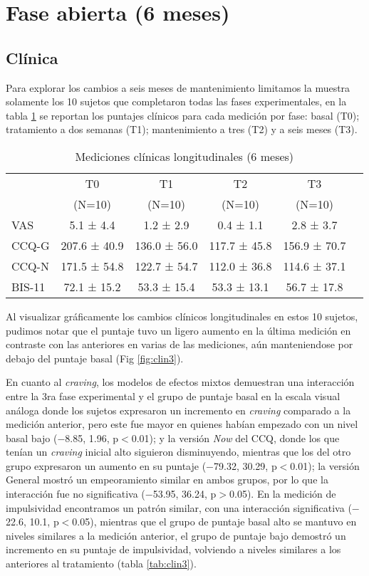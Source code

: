 \section{Fase abierta (6 meses)}
\subsection{Clínica}

Para explorar los cambios a seis meses de mantenimiento limitamos la muestra solamente los 10 sujetos que completaron todas las fases experimentales, en la tabla \ref{tab:cl3} se reportan los puntajes clínicos para cada medición por fase: basal (T0); tratamiento a dos semanas (T1); mantenimiento a tres (T2) y a seis meses (T3).

\begin{table}[!hbp]
    \centering
    \small
    \caption{Mediciones clínicas longitudinales (6 meses)}
    \label{tab:cl3}
\begin{tabular}{lccccc}
\hline
 & T0 & T1 & T2 & T3 \\
 & (N=10) & (N=10) & (N=10) & (N=10)\\
\hline
VAS   &  5.1 ±  4.4 &  1.2 ±  2.9 &  0.4 ±  1.1 &  2.8 ±  3.7 \\
CCQ-G  & 207.6 ± 40.9 & 136.0 ± 56.0 & 117.7 ± 45.8 & 156.9 ± 70.7 \\
CCQ-N  & 171.5 ± 54.8 & 122.7 ± 54.7 & 112.0 ± 36.8 & 114.6 ± 37.1 \\
BIS-11 & 72.1 ± 15.2 & 53.3 ± 15.4 & 53.3 ± 13.1 & 56.7 ± 17.8 \\
\hline
\end{tabular}
\end{table}

Al visualizar gráficamente los cambios clínicos longitudinales en estos 10 sujetos, pudimos notar que el puntaje tuvo un ligero aumento en la última medición en contraste con las anteriores en varias de las mediciones, aún manteniendose por debajo del puntaje basal (Fig \ref{fig:clin3}). \par
En cuanto al \textit{craving}, los modelos de efectos mixtos demuestran una interacción entre la 3ra fase experimental y el grupo de puntaje basal en la escala visual análoga donde los sujetos expresaron un incremento en \textit{craving} comparado a la medición anterior, pero este fue mayor en quienes habían empezado con un nivel basal bajo ($-$8.85, 1.96, p$<$0.01); y la versión \textit{Now} del CCQ, donde los que tenían un \textit{craving} inicial alto siguieron disminuyendo, mientras que los del otro grupo expresaron un aumento en su puntaje ($-$79.32, 30.29, p$<$0.01); la versión General mostró un empeoramiento similar en ambos grupos, por lo que la interacción fue no significativa ($-$53.95, 36.24, p$>$0.05). En la medición de impulsividad encontramos un patrón similar, con una interacción significativa ($-$22.6, 10.1, p$<$0.05), mientras que el grupo de puntaje basal alto se mantuvo en niveles similares a la medición anterior, el grupo de puntaje bajo demostró un incremento en su puntaje de impulsividad, volviendo a niveles similares a los anteriores al tratamiento (tabla \ref{tab:clin3}).


